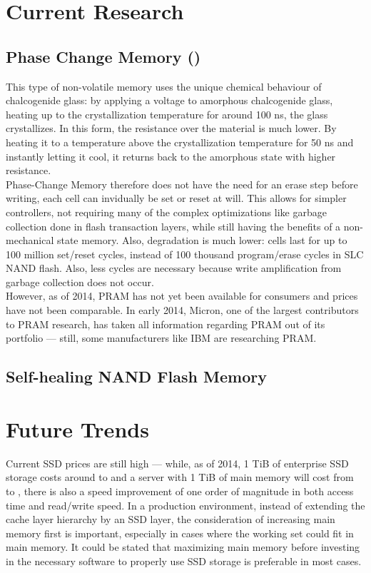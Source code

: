 \documentclass{acm_proc_article-sp}
\begin{document}
\section{Current Research}

\subsection{Phase Change Memory ()}
This type of non-volatile memory uses the unique chemical behaviour of chalcogenide glass: by applying a voltage to amorphous chalcogenide glass, heating up to the crystallization temperature for around 100 ns, the glass crystallizes. In this form, the resistance over the material is much lower. By heating it to a temperature above the crystallization temperature for 50 ns and instantly letting it cool, it returns back to the amorphous state with higher resistance.
\\
Phase-Change Memory therefore does not have the need for an erase step before writing, each cell can invidually be set or reset at will. This allows for simpler controllers, not requiring many of the complex optimizations like garbage collection done in flash transaction layers, while still having the benefits of a non-mechanical state memory. Also, degradation is much lower: cells last for up to 100 million set/reset cycles, instead of 100 thousand program/erase cycles in SLC NAND flash. Also, less cycles are necessary because write amplification from garbage collection does not occur.
\\
However, as of 2014, PRAM has not yet been available for consumers and prices have not been comparable. In early 2014, Micron, one of the largest contributors to PRAM research, has taken all information regarding PRAM out of its portfolio --- still, some manufacturers like IBM are researching PRAM.

\subsection{Self-healing NAND Flash Memory}
\cite{wu2011exploiting}
\cite{chen2013dheating}

\section{Future Trends}
Current SSD prices are still high --- while, as of 2014, 1 TiB of enterprise SSD storage costs around  to  and a server with 1 TiB of main memory will cost from  to , there is also a speed improvement of one order of magnitude in both access time and read/write speed. In a production environment, instead of extending the cache layer hierarchy by an SSD layer, the consideration of increasing main memory first is important, especially in cases where the working set could fit in main memory. It could be stated that maximizing main memory before investing in the necessary software to properly use SSD storage is preferable in most cases.







\balancecolumns
\end{document}
